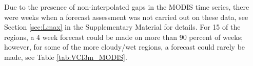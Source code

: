 \documentclass[review]{elsarticle}
\begin{document}


Due to the presence of non-interpolated gaps in the MODIS time series, there were weeks when a forecast assessment was not carried out on these data, see Section \ref{sec:Lmax} in the Supplementary Material for details.  For 15 of the regions, a 4 week forecast could be made on more than 90 percent of weeks; however, for some of the more cloudy/wet regions, a forecast could rarely be made, see Table \ref{tab:VCI3m_MODIS}.

\end{document}
